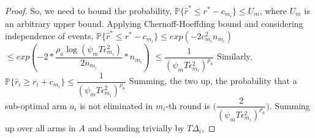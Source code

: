 \begin{proof}
	So, we need to bound the probability,
\newline\hspace*{4em} $\mathbb{P}\lbrace\hat{r}^{*}\leq r^{*} - c_{m_{i}}\rbrace\leq U_{m}$, where $U_{m}$ is an  arbitrary upper bound.
\newline
Applying Chernoff-Hoeffding bound and considering independence of events,
\newline
\newline\hspace*{0em} $\mathbb{P}\lbrace\hat{r}^{*}\leq r^{*} - c_{m_{i}}\rbrace\leq exp(-2c_{m_{i}}^{2}n_{m_{i}})$
\newline\hspace*{8em} $\leq exp(-2 * \dfrac{\rho_{a}\log (\psi_{m}T\epsilon_{m_{i}}^{2})}{2 n_{m_{i}}} *n_{m_{i}})$
\newline\hspace*{8em} $\leq \dfrac{1}{(\psi_{m}T\epsilon_{m_{i}}^{2})^{\rho_{a}}}$
\newline
Similarly, $\mathbb{P}\lbrace\hat{r}_{i}\geq r_{i} + c_{m_{i}}\rbrace\leq \dfrac{1}{(\psi_{m}T\epsilon_{m_{i}}^{2})^{\rho_{a}}}$
\newline
Summing, the two up, the probability that a sub-optimal arm $a_{i}$ is not eliminated in $m_{i}$-th round is  $\bigg(\dfrac{2}{(\psi_{m}T\epsilon_{m_{i}}^{2})^{\rho_{a}}}\bigg)$. 
\newline
Summing up over all arms in $A$ and bounding trivially by $T\Delta_{i}$,
\newline

\end{proof}

